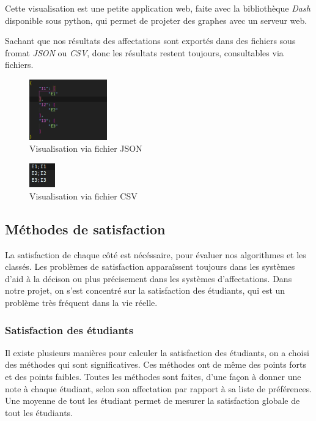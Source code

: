 \documentclass[12pt,titlepage]{article}
\begin{document}
Cette visualisation est une petite application web, faite avec la bibliothèque \textit{Dash} disponible sous python, qui permet de projeter des graphes avec un serveur web.

Sachant que nos résultats des affectations sont exportés dans des fichiers sous fromat \textit{JSON} ou \textit{CSV}, donc les résultats restent toujours, consultables via fichiers. 

\begin{figure}[!h]
  \caption{Visualisation via fichier JSON\\}
  \centering
  \includegraphics[width = 0.3\textwidth]{img/screen_json.png}
\end{figure}

\begin{figure}[!h]
  \caption{Visualisation via fichier CSV\\}
  \centering
  \includegraphics[width = 0.1\textwidth]{img/screen_csv.png}
\end{figure}

\subsection{Méthodes de satisfaction}
La satisfaction de chaque côté est nécéssaire, pour évaluer nos algorithmes et les classés. Les problèmes de satisfaction apparaîssent toujours dans les systèmes d'aid à la décison ou plus précisement dans les systèmes d'affectations. Dans notre projet, on s'est concentré sur la satisfaction des étudiants, qui est un problème très fréquent dans la vie réelle. 
\subsubsection*{Satisfaction des étudiants}
Il existe plusieurs manières pour calculer la satisfaction des étudiants, on a choisi des méthodes qui sont significatives. Ces méthodes ont de même des points forts et des points faibles.
Toutes les méthodes sont faites, d'une façon à donner une note à chaque étudiant, selon son affectation par rapport à sa liste de préférences. Une moyenne de tout les étudiant permet de mesurer la satisfaction globale de tout les étudiants. 
\end{document}
